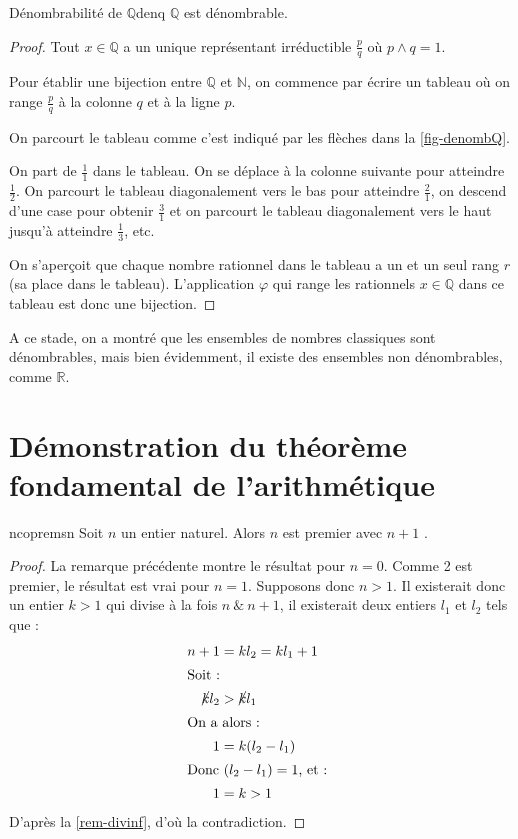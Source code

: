 \documentclass[a4paper,french]{memoir}
\begin{document}
\begin{theoremb}{Dénombrabilité de $\mathbb{Q}$}{denq}
	$\mathbb{Q}$ est dénombrable.
\end{theoremb}

\begin{proof}
	Tout $x \in \mathbb{Q}$ a un unique représentant irréductible $\frac{p}{q}$ où $p \wedge q = 1$. 
	
	Pour établir une bijection entre $\mathbb{Q}$ et $\mathbb{N}$, on commence par écrire un tableau où on range $\frac{p}{q}$ à la colonne $q$ et à la ligne $p$.  
	
	On parcourt le tableau comme c'est indiqué par les flèches dans la \cref{fig-denombQ}. 
	
	On part de $\frac{1}{1}$ dans le tableau. On se déplace à la colonne suivante pour atteindre $\frac{1}{2}$. On parcourt le tableau diagonalement vers le bas pour atteindre $\frac{2}{1}$, on descend d'une case pour obtenir $\frac{3}{1}$ et on parcourt le tableau diagonalement vers le haut jusqu'à atteindre $\frac{1}{3}$, etc. 
	
	On s'aperçoit que chaque nombre rationnel dans le tableau a un et un seul rang $r$ (sa place dans le tableau). L'application $\varphi$ qui range les rationnels $x \in \mathbb{Q}$ dans ce tableau est donc une bijection.
	
	 
\end{proof}
\diagdenomb

A ce stade, on a montré que les ensembles de nombres classiques sont dénombrables, mais bien évidemment, il existe des ensembles non dénombrables, comme $\mathbb{R}$. 


\nocite{*}
\printbibliography
\appendix %
\chapter{Démonstration du théorème fondamental de l'arithmétique}\label{annexe-thmfondarith}
\begin{lemmab}{}{ncopremsn}
  Soit $n$ un entier naturel. Alors $n$ est premier avec $n+1$ .
\end{lemmab}
\begin{proof}
La remarque précédente montre le résultat pour $n=0$. Comme 2 est premier, le résultat est vrai pour $n=1$. Supposons donc $n>1$. Il existerait donc un entier $k>1$ qui divise à la fois $n~\&~n+1$, il existerait deux entiers $l_1$ et $l_2$ tels que :  
\begin{align*}
  n+1& =kl_2=kl_{1}+1\\
\shortintertext{Soit~:} 
\cancel{k}l_2& >\cancel{k}l_1\\
\shortintertext{On a alors~:} 
1& =k(l_2-l_1)\\
\intertext{Donc $(l_2-l_1)= 1$, et : }
1& =k>1
\end{align*}
D'après la \cref{rem-divinf}, d'où la contradiction.
\end{proof}
\end{document}
